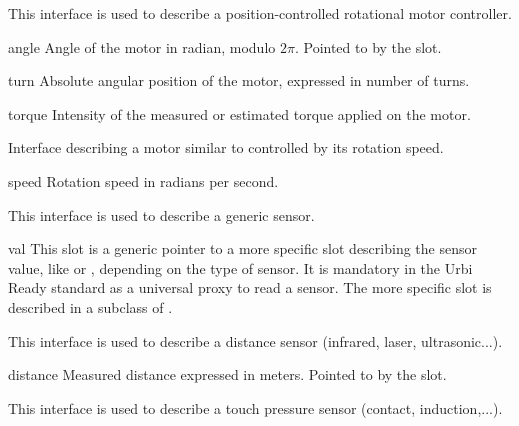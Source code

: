 

This interface is used to describe a position-controlled rotational motor
controller.

\begin{urbiscriptapi}
\item[angle] Angle of the motor in radian, modulo $2\pi$. Pointed to by the
   slot.

\item[turn] Absolute angular position of the motor, expressed in number of
  turns.

\item[torque] Intensity of the measured or estimated torque applied on the
  motor.
\end{urbiscriptapi}


Interface describing a motor similar to  controlled
by its rotation speed.

\begin{urbiscriptapi}
\item[speed] Rotation speed in radians per second.
\end{urbiscriptapi}


This interface is used to describe a generic sensor.

\begin{urbiscriptapi}
\item[val] This slot is a generic pointer to a more specific slot describing
  the sensor value, like  or , depending on
  the type of sensor. It is mandatory in the Urbi Ready standard as a
  universal proxy to read a sensor. The more specific slot is described in a
  subclass of .
\end{urbiscriptapi}



This interface is used to describe a distance sensor (infrared, laser,
ultrasonic...).

\begin{urbiscriptapi}
\item[distance] Measured distance expressed in meters.  Pointed to by the
   slot.
\end{urbiscriptapi}



This interface is used to describe a touch pressure sensor (contact,
induction,...).

